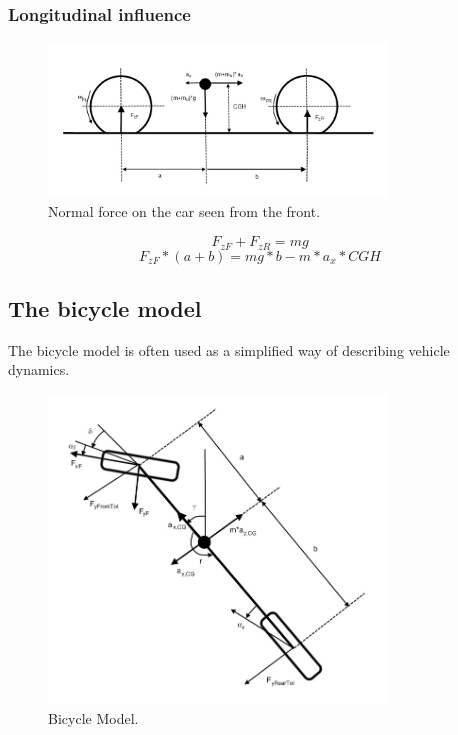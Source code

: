 \subsubsection{Longitudinal influence}

\begin{figure}[h]
	\centering
	\includegraphics[width=0.8\textwidth]{Pictures/normal_force_longitudinal}
	\caption{Normal force on the car seen from the front.}
	\label{normal_force_longitudinal}
\end{figure}
\begin{equation} \label{eq:normal_2}
	F_{zF} + F_{zR} = mg
\end{equation}
\begin{equation} \label{eq:normal_with_long_acc}
	F_{zF}*(a+b) = mg*b - m*a_{x}*CGH
\end{equation}

\subsection{The bicycle model}
The bicycle model is often used as a simplified way of describing vehicle dynamics.

\begin{figure}[h]
	\centering
	\includegraphics[width=0.8\textwidth]{Pictures/bicycle_model}
	\caption {Bicycle Model. \cite{fordonsdynamik99}}
	\label{bicycle_model}
\end{figure}

